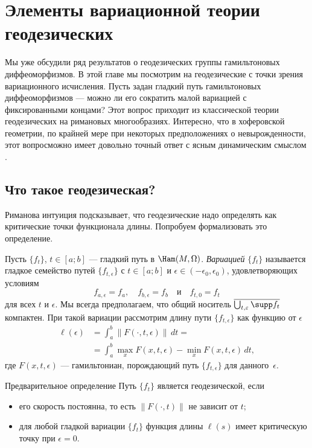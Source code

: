 \chapter[Геодезические]{Элементы вариационной теории геодезических}\label{chap:12}

Мы уже обсудили ряд результатов о геодезических группы гамильтоновых
диффеоморфизмов. 
В этой главе мы посмотрим на геодезические с точки зрения
вариационного исчисления. 
Пусть задан гладкий путь гамильтоновых диффеоморфизмов — можно ли
его сократить малой вариацией с фиксированными концами? 
Этот вопрос приходит из классической теории геодезических на римановых многообразиях. 
Интересно, что в хоферовской геометрии, по крайней мере при некоторых
предположениях о невырожденности, этот вопросможно имеет довольно точный
ответ с ясным динамическим смыслом \cite{U}. 

\section{Что такое геодезическая?}

Риманова интуиция подсказывает, что геодезические надо определять
как критические точки функционала длины. 
Попробуем формализовать это определение.

Пусть $\{f_t\}$, $t\in[a; b]$ — гладкий путь в $\Ham(M,\Omega)$.
\emph{Вариацией} $\{f_t\}$ называется гладкое
семейство путей $\{f_{t,\epsilon}\}$ с $t \in [a; b]$ и $\epsilon \in
(-\epsilon_0, \epsilon_0)$, удовлетворяющих условиям
\[f_{a,\epsilon} = f_a,\quad f_{b,\epsilon} = f_b\quad\text{и}\quad f_{t,0} = f_t\]
для всех $t$ и $\epsilon$.
Мы всегда предполагаем, что общий носитель
$\overline{\bigcup_{t,\epsilon}\supp f_t}$ компактен.
При такой вариации рассмотрим длину пути $\{f_{t,\epsilon}\}$ как функцию от $\epsilon$ \index[symb]{$\ell(\epsilon)$}
\begin{align*}
\ell(\epsilon)&=\int_a^b\|F(\cdot,t,\epsilon)\|\,dt=
\\
&=\int_a^b \max_x F(x,t,\epsilon)-\min_x F(x,t,\epsilon)\,dt,
\end{align*} 
где $F(x, t, \epsilon)$ — гамильтониан, порождающий путь $\{f_{t,\epsilon}\}$ для данного~$\epsilon$.

\begin{ex}{Предварительное определение}\label{12.1.A}
Путь $\{f_t\}$ является геодезической, если
\begin{itemize}
\item его скорость постоянна, то есть $\|F(\cdot, t)\|$ не зависит от $t$;
\item для любой гладкой вариации $\{f_t\}$ функция длины $\ell(s)$ имеет критическую точку при $\epsilon = 0$.
\end{itemize}
\end{ex}

